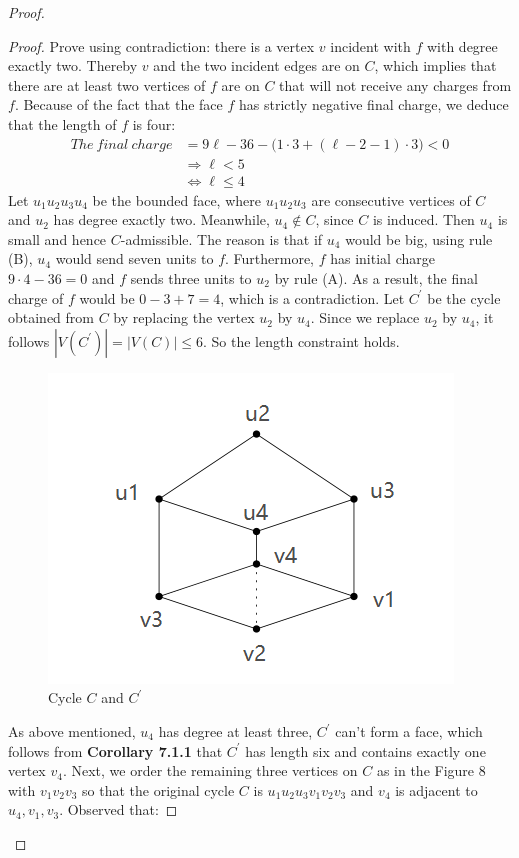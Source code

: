\begin{proof}
\begin{proof}
Prove using contradiction: there is a vertex $v$ incident with $f$ with degree exactly two. Thereby $v$ and the two incident edges are on $C$, which implies that there are at least two vertices of $f$ are on $C$ that will not receive any charges from $f$. Because of the fact that the face $f$ has strictly negative final charge, we deduce that the length of $f$ is four:
\begin{align*}
    The \ final \ charge &= 9\ell -36 - \big(1 \cdot 3 + (\ell - 2 - 1) \cdot 3\big) < 0\\
    &\Longrightarrow \ell < 5\\
    &\Longleftrightarrow \ell \leq 4 
\end{align*}
Let $u_1u_2u_3u_4$ be the bounded face, where $u_1u_2u_3$ are consecutive vertices of $C$ and $u_2$ has degree exactly two. Meanwhile, $u_4 \notin C$, since $C$ is induced. Then $u_4$ is small and hence $C$-admissible. The reason is that if $u_4$ would be big, using rule (B), $u_4$ would send seven units to $f$. Furthermore, $f$ has initial charge $9\cdot4 - 36 = 0$ and $f$ sends three units to $u_2$ by rule (A). As a result, the final charge of $f$ would be $0 - 3 + 7 = 4$, which is a contradiction. Let $C^{'}$ be the cycle obtained from $C$ by replacing the vertex $u_2$ by $u_4$. Since we replace $u_2$ by $u_4$, it follows $|V(C^{'})| = |V(C)| \leq 6$. So the length constraint holds.
\begin{figure}[H] %
    \centering %
    \includegraphics[width=0.4 \textwidth]{figure/corollary3.png} 
    \caption{Cycle $C$ and $C^{'}$} %
    \label{figure} %
\end{figure}
As above mentioned, $u_4$ has degree at least three, $C^{'}$ can't form a face, which follows from \textbf{Corollary 7.1.1} that $C^{'}$ has length six and contains exactly one vertex $v_4$. Next, we order the remaining three vertices on $C$ as in the Figure 8 with $v_1v_2v_3$ so that the original cycle $C$ is $u_1u_2u_3v_1v_2v_3$ and $v_4$ is adjacent to $u_4, v_1, v_3$. Observed that:

\end{proof}
\end{proof}
